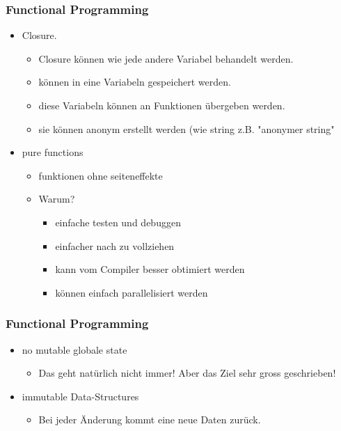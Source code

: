 \documentclass[compress, blue]{beamer}
\begin{document}
\begin{frame}\frametitle{Functional Programming}
  \begin{itemize}
  \item Closure.\pause
    \begin{itemize}
      \item Closure können wie jede andere Variabel behandelt werden.\pause
      \item können in eine Variabeln gespeichert werden.\pause
      \item diese Variabeln können an Funktionen übergeben werden.\pause
      \item sie können anonym erstellt werden (wie string
        z.B. "anonymer string" \pause
    \end{itemize}
  \end{itemize}

  \begin{itemize}
  \item pure functions \pause
    \begin{itemize}
       \item funktionen ohne  seiteneffekte \pause
       \item Warum? \pause
         \begin{itemize}
          \item einfache testen und debuggen \pause
          \item einfacher nach zu vollziehen \pause
          \item kann vom Compiler besser obtimiert werden \pause
          \item können einfach parallelisiert werden \pause
         \end{itemize}
    \end{itemize}
  \end{itemize}

\end{frame}

\begin{frame}\frametitle{Functional Programming}

  \begin{itemize}
  \item no mutable globale state \pause
    \begin{itemize}
       \item Das geht natürlich nicht immer! Aber das Ziel sehr gross
         geschrieben! \pause
    \end{itemize}
  \end{itemize}

  \begin{itemize}
  \item immutable Data-Structures \pause
    \begin{itemize}
       \item Bei jeder Änderung kommt eine neue Daten
         zurück.\pause
    \end{itemize}
  \end{itemize}
  
\end{frame}
\end{document}
